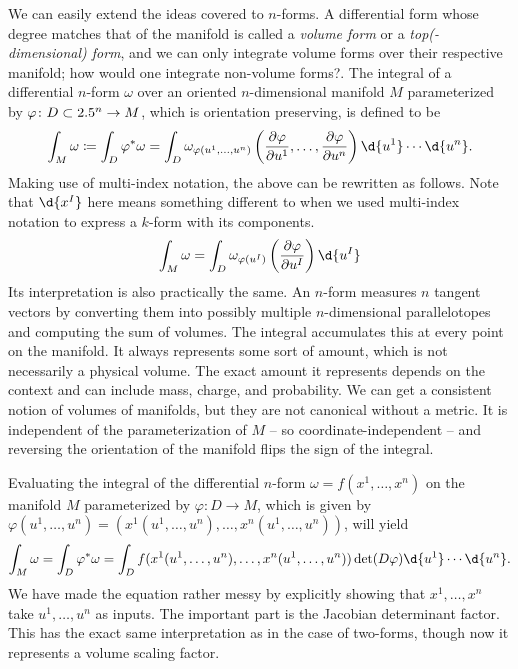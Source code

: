 \documentclass[a4paper,12pt]{article}
\begin{document}
We can easily extend the ideas covered to $n$-forms.
A differential form whose degree matches that of the manifold is called a \emph{volume form} or a \emph{top(-dimensional) form}, and we can only integrate volume forms over their respective manifold; how would one integrate non-volume forms?.
The integral of a differential $n$-form $\omega$ over an oriented $n$-dimensional manifold $M$ parameterized by $\varphi \colon D \subset 2.5^n \to M$, which is orientation preserving, is defined to be
\begin{equation*}
    \int_M \omega \coloneq \int_D \varphi^*\omega = \int_D \omega_{\varphi(u^1, \ldots, u^n)}\left(\frac{\partial \varphi}{\partial u^1}, \ldots, \frac{\partial \varphi}{\partial u^n}\right) \d{u^1} \cdots \d{u^n}.
\end{equation*}
Making use of multi-index notation, the above can be rewritten as follows.
Note that $\d{x^I}$ here means something different to when we used multi-index notation to express a $k$-form with its components.
\begin{equation*}
    \int_M \omega = \int_D \omega_{\varphi(u^I)}\left(\frac{\partial \varphi}{\partial u^I}\right) \d{u^I}
\end{equation*}
Its interpretation is also practically the same.
An $n$-form measures $n$ tangent vectors by converting them into possibly multiple $n$-dimensional parallelotopes and computing the sum of volumes.
The integral accumulates this at every point on the manifold.
It always represents some sort of amount, which is not necessarily a physical volume.
The exact amount it represents depends on the context and can include mass, charge, and probability.
We can get a consistent notion of volumes of manifolds, but they are not canonical without a metric.
It is independent of the parameterization of $M$ -- so coordinate-independent -- and reversing the orientation of the manifold flips the sign of the integral.

Evaluating the integral of the differential $n$-form $\omega = f(x^1, \ldots, x^n)$ on the manifold $M$ parameterized by $\varphi \colon D \to M$, which is given by $\varphi(u^1, \ldots, u^n) = (x^1(u^1, \ldots, u^n), \ldots, \allowbreak x^n(u^1, \ldots, u^n))$, will yield
\begin{equation*}
    \int_M \omega = \int_D \varphi^*\omega = \int_D f(x^1(u^1, \ldots, u^n), \ldots, x^n(u^1, \ldots, u^n)) \det(D\varphi) \d{u^1} \cdots \d{u^n}.
\end{equation*}
We have made the equation rather messy by explicitly showing that $x^1, \ldots, x^n$ take $u^1, \ldots, u^n$ as inputs.
The important part is the Jacobian determinant factor.
This has the exact same interpretation as in the case of two-forms, though now it represents a volume scaling factor.
\end{document}
